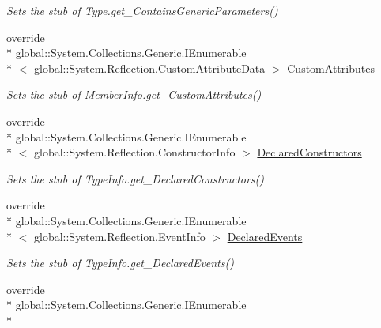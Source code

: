 \begin{DoxyCompactItemize}
\begin{DoxyCompactList}\small\item\em Sets the stub of Type.\-get\-\_\-\-Contains\-Generic\-Parameters()\end{DoxyCompactList}\item 
override \\*
global\-::\-System.\-Collections.\-Generic.\-I\-Enumerable\\*
$<$ global\-::\-System.\-Reflection.\-Custom\-Attribute\-Data $>$ \hyperlink{class_system_1_1_reflection_1_1_fakes_1_1_stub_type_delegator_afa3cabfb433630d47b82105d04ac4162}{Custom\-Attributes}
\begin{DoxyCompactList}\small\item\em Sets the stub of Member\-Info.\-get\-\_\-\-Custom\-Attributes()\end{DoxyCompactList}\item 
override \\*
global\-::\-System.\-Collections.\-Generic.\-I\-Enumerable\\*
$<$ global\-::\-System.\-Reflection.\-Constructor\-Info $>$ \hyperlink{class_system_1_1_reflection_1_1_fakes_1_1_stub_type_delegator_ad028a98c04c8800043cf84c85fde9b62}{Declared\-Constructors}
\begin{DoxyCompactList}\small\item\em Sets the stub of Type\-Info.\-get\-\_\-\-Declared\-Constructors()\end{DoxyCompactList}\item 
override \\*
global\-::\-System.\-Collections.\-Generic.\-I\-Enumerable\\*
$<$ global\-::\-System.\-Reflection.\-Event\-Info $>$ \hyperlink{class_system_1_1_reflection_1_1_fakes_1_1_stub_type_delegator_ac6b9bf04780088e42aa0364d3d5fdd08}{Declared\-Events}
\begin{DoxyCompactList}\small\item\em Sets the stub of Type\-Info.\-get\-\_\-\-Declared\-Events()\end{DoxyCompactList}\item 
override \\*
global\-::\-System.\-Collections.\-Generic.\-I\-Enumerable\\*

\end{DoxyCompactItemize}
